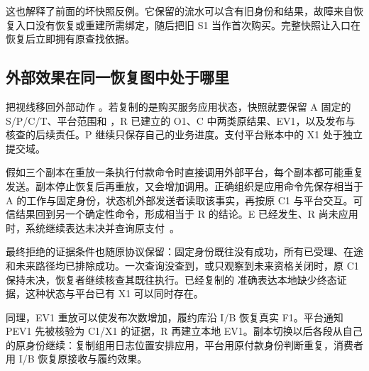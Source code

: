 这也解释了前面的坏快照反例。它保留的流水可以含有旧身份和结果，故障来自恢复入口没有恢复或重建所需绑定，随后把旧 S1 当作首次购买。完整快照让入口在恢复后立即拥有原查找依据。

\subsection*{外部效果在同一恢复图中处于哪里}

把视线移回外部动作 。若复制的是购买服务应用状态，快照就要保留 A 固定的 S/P/C/T、平台范围和 ，R 已建立的 O1、C 中两类原结果、EV1，以及发布与核查的后续责任。P 继续只保存自己的业务进度。支付平台账本中的 X1 处于独立提交域。

假如三个副本在重放一条执行付款命令时直接调用外部平台，每个副本都可能重复发送。副本停止恢复后再重放，又会增加调用。正确组织是应用命令先保存相当于 A 的工作与固定身份，状态机外部发送者读取该事实，再按原 C1 与平台交互。可信结果回到另一个确定性命令，形成相当于 R 的结论。E 已经发生、R 尚未应用时，系统继续表达未决并查询原支付~\cite{rifl}。

最终拒绝的证据条件也随原协议保留：固定身份既往没有成功，所有已受理、在途和未来路径均已排除成功。一次查询没查到，或只观察到未来资格关闭时，原 C1 保持未决，恢复者继续核查其既往执行。已经复制的  准确表达本地缺少终态证据，这种状态与平台已有 X1 可以同时存在。


同理，EV1 重放可以使发布次数增加，履约库沿 I/B 恢复真实 F1。平台通知 PEV1 先被核验为 C1/X1 的证据，R 再建立本地 EV1。副本切换以后各段从自己的原身份继续：复制组用日志位置安排应用，平台用原付款身份判断重复，消费者用 I/B 恢复原接收与履约效果。
\FloatBarrier
